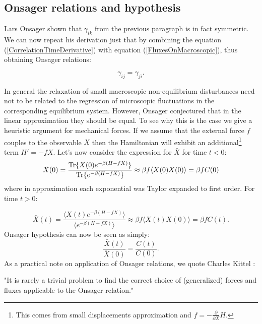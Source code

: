 \documentclass[a4paper,12pt]{article}
\begin{document}
\subsection{Onsager relations and hypothesis}
\label{OnsagerRelationsSection}

Lars Onsager \cite{Onsager:zgWBDrcO} shown that $\gamma_{ik}$ from the previous paragraph is in fact symmetric. We can now repeat his derivation just that by combining the equation (\ref{CorrelationTimeDerivative}) with equation (\ref{FluxesOnMacroscopic}), thus obtaining Onsager relations:

\begin{equation}
\label{OnsagerRelations}
  \gamma_{ij}=\gamma_{ji}.
\end{equation}

In general the relaxation of small macroscopic non-equilibrium disturbances need not to be related to the regression of microscopic fluctuations in the corresponding equilibrium system. 
However, Onsager conjectured that in the linear approximation they should be equal. To see why this is the case we give a heuristic argument for mechanical forces.
If we assume that the external force $f$ couples to the observable $X$ then the Hamiltonian will exhibit an additional\footnote{This comes from small displacements approximation and $f=-\frac{\partial}{\partial{X}} H$.} term $H'=-f X$.
Let's now consider the expression for $\bar{X}$ for time $t < 0$:
\begin{equation}
  \bar{X}(0)=\frac{\Tr\{ X(0) e^{-\beta (H-f X)} \}}{\Tr\{ e^{-\beta (H-f X)} \}} \approx \beta f \langle X(0)X(0) \rangle= \beta f C(0)
\end{equation}
where in approximation each exponential was Taylor expanded to first order.
For time $t>0$:

\begin{equation}
  \bar{X}(t)=\frac{\langle X(t) e^{-\beta (H-f X)} \rangle}{\langle e^{-\beta (H-f X)} \rangle} \approx \beta f \langle X(t)X(0) \rangle= \beta f C(t).
\end{equation}
Onsager hypothesis can now be seen as simply:
\begin{equation}
  \frac{\bar{X}(t)}{\bar{X}(0)}=\frac{C(t)}{C(0)}.
\end{equation}
As a practical note on application of Onsager relations, we quote Charles Kittel \cite{Kittel:817295}:
\begin{displayquote}
"It is rarely a trivial problem to find the correct choice of (generalized) forces and fluxes applicable to the Onsager relation."
\end{displayquote}
\end{document}
